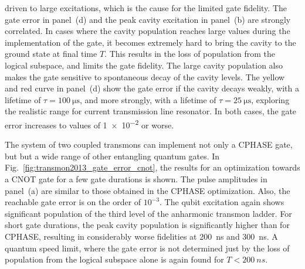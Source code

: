 driven to large excitations, which is the cause for the limited gate fidelity.
The gate error in panel~(d) and the peak cavity excitation in panel~(b) are
strongly correlated. In cases where the cavity population reaches large values
during the implementation of the gate, it becomes extremely hard to bring the
cavity to the ground state at final time $T$. This results in the loss of
population from the logical subspace, and limits the gate fidelity. The large
cavity population also makes the gate sensitive to spontaneous decay of the
cavity levels. The yellow and red curve in panel~(d) show the gate error if the
cavity decays weakly, with a lifetime of $\tau = \SI{100}{\micro\second}$, and
more strongly, with a lifetime of $\tau = \SI{25}{\micro\second}$, exploring the
realistic range for current transmission line resonator. In both cases, the gate
error increases to values of \num{1e-2} or worse.

The system of two coupled transmons can implement not only a CPHASE gate, but
but a wide range of other entangling quantum gates. In
Fig.~\ref{fig:transmon2013_gate_error_cnot}, the results for an optimization
towards a CNOT gate for a few gate durations is shown. The pulse amplitudes in
panel~(a) are similar to those obtained in the CPHASE optimization. Also, the
reachable gate error is on the order of $10^{-3}$. The qubit excitation again
shows significant population of the third level of the anharmonic transmon
ladder. For short gate durations, the peak cavity population is significantly
higher than for CPHASE, resulting in considerably worse fidelities at
\SI{200}{ns} and \SI{300}{ns}. A quantum speed limit, where the gate error is
not determined just by the loss of population from the logical subspace alone is
again found for $T<\SI{200}{ns}$.

